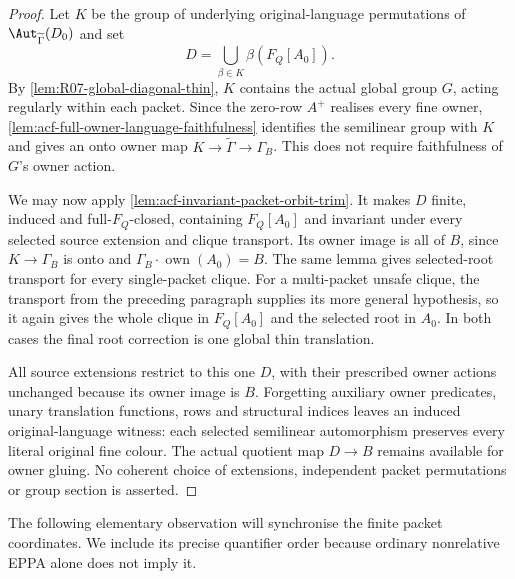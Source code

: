 \begin{proof}
Let \(K\) be the group of underlying original-language
permutations of \(\Aut_{\widetilde\Gamma}(D_0)\) and set
\[
                   D=\bigcup_{\beta\in K}\beta(F_Q[A_0]).
\]
By \cref{lem:R07-global-diagonal-thin}, \(K\) contains the
actual global group \(G\), acting regularly within each packet.
Since the zero-row \(A^+\) realises every fine owner,
\cref{lem:acf-full-owner-language-faithfulness} identifies the
semilinear group with \(K\) and gives an onto owner map
\(K\to\widetilde\Gamma\to\Gamma_B\). This does not require
faithfulness of \(G\)'s owner action.

We may now apply \cref{lem:acf-invariant-packet-orbit-trim}.
It makes \(D\) finite, induced and full-\(F_Q\)-closed, containing
\(F_Q[A_0]\) and invariant under every selected source extension
and clique transport. Its owner image is all of \(B\), since
\(K\to\Gamma_B\) is onto and
\(\Gamma_B\cdot\operatorname{own}(A_0)=B\).
The same lemma gives selected-root transport for every
single-packet clique. For a multi-packet unsafe clique, the
transport from the preceding paragraph supplies its more general
hypothesis, so it again gives the whole clique in \(F_Q[A_0]\)
and the selected root in \(A_0\). In both cases the final root
correction is one global thin translation.

All source extensions restrict to this one \(D\), with their
prescribed owner actions unchanged because its owner image is
\(B\). Forgetting auxiliary owner predicates, unary translation
functions, rows and structural indices leaves an induced
original-language witness: each selected semilinear automorphism
preserves every literal original fine colour. The actual quotient
map \(D\to B\) remains available for owner gluing. No coherent
choice of extensions, independent packet permutations or group
section is asserted.
\end{proof}

The following elementary observation will synchronise the
finite packet coordinates.  We include its precise
quantifier order because ordinary nonrelative EPPA alone
does not imply it.

